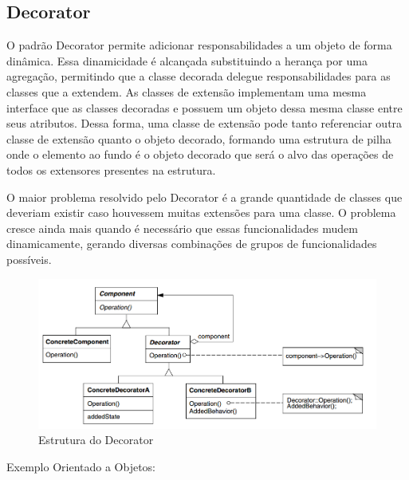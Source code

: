 \subsection{Decorator}

O padrão Decorator permite adicionar responsabilidades a um 
objeto de forma dinâmica. Essa dinamicidade é alcançada 
substituindo a herança por uma agregação, permitindo que a 
classe decorada delegue responsabilidades para as classes que 
a extendem. As classes de extensão implementam uma mesma 
interface que as classes decoradas e possuem um objeto dessa 
mesma classe entre seus atributos. Dessa forma, uma classe 
de extensão pode tanto referenciar outra classe de extensão 
quanto o objeto decorado, formando uma estrutura de pilha 
onde o elemento ao fundo é o objeto decorado que será o 
alvo das operações de todos os extensores presentes na 
estrutura.

O maior problema resolvido pelo Decorator é a grande 
quantidade de classes que deveriam existir caso houvessem 
muitas extensões para uma classe. O problema cresce ainda 
mais quando é necessário que essas funcionalidades mudem 
dinamicamente, gerando diversas combinações de grupos de 
funcionalidades possíveis.

\begin{figure}[htb]
	\caption{\label{fig_grafico}Estrutura do Decorator}
	\begin{center}
	    \includegraphics[scale=0.5]{5_padroes-contexto-funcional/5.2_estruturais/5.2.4_decorator/diagram.png}
	\end{center}
\end{figure}

Exemplo Orientado a Objetos:

\begin{lstlisting}[caption={Decorator Orientado a Objetos},label=oodecorator]



\end{lstlisting}

